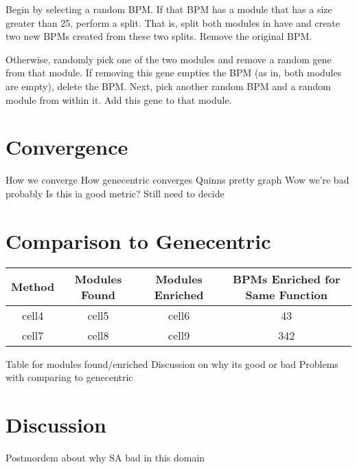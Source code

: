 \documentclass[11pt]{article}
\begin{document}
\par Begin by selecting a random BPM. If that BPM has a module that has a size greater than 25, perform a split. That is, split both modules in have and create two new BPMs created from these two splits. Remove the original BPM.

\par Otherwise, randomly pick one of the two modules and remove a random gene from that module. If removing this gene empties the BPM (as in, both modules are empty), delete the BPM. Next, pick another random BPM and a random module from within it. Add this gene to that module. 

\section{Convergence}
How we converge
How genecentric converges
Quinns pretty graph
Wow we're bad probably
Is this ia good metric? Still need to decide



\section{Comparison to Genecentric}

\begin{center}
\begin{tabular}{ |c | c c| c | } 
 \hline
 Method & Modules Found & Modules Enriched & BPMs Enriched for Same Function \\
	\hline
 cell4 & cell5 & cell6 & 43\\ 
	\hline 
 cell7 & cell8 & cell9 & 342\\ 
 \hline
\end{tabular}
\end{center}


Table for modules found/enriched
Discussion on why its good or bad
Problems with comparing to genecentric


\section{Discussion}
Postmordem about why SA bad in this domain
\end{document}
